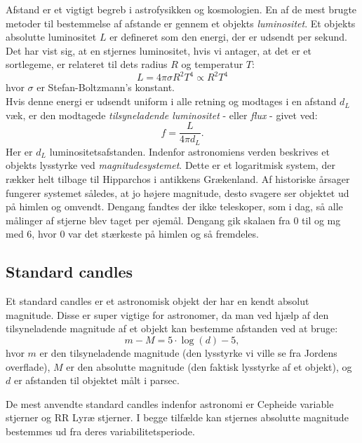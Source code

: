 \s
Afstand er et vigtigt begreb i astrofysikken og kosmologien. En af de mest brugte metoder til bestemmelse af afstande er gennem et objekts \textit{luminositet}. Et objekts absolutte luminositet $L$ er defineret som den energi, der er udsendt per sekund. Det har vist sig, at en stjernes luminositet, hvis vi antager, at det er et sortlegeme, er relateret til dets radius $R$ og temperatur $T$:
\begin{equation}
L = 4\pi\sigma R^2T^4 \propto R^2 T^4
\end{equation}
hvor $\sigma$ er Stefan-Boltzmann's konstant. \\
Hvis denne energi er udsendt uniform i alle retning og modtages i en afstand $d_L$ væk, er den modtagede \textit{tilsyneladende luminositet} - eller \textit{flux} - givet ved:
\begin{equation}
f = \frac{L}{4\pi d_L}.
\end{equation}
Her er $d_L$ luminositetsafstanden. Indenfor astronomiens verden beskrives et objekts lysstyrke ved \textit{magnitudesystemet}. Dette er et logaritmisk system, der rækker helt tilbage til Hipparchos i antikkens Grækenland. Af historiske årsager fungerer systemet således, at jo højere magnitude, desto svagere ser objektet ud på himlen og omvendt. Dengang fandtes der ikke teleskoper, som i dag, så alle målinger af stjerne blev taget per øjemål. Dengang gik skalaen fra 0 til og mg med 6, hvor 0 var det stærkeste på himlen og så fremdeles.

\subsection{Standard candles}

Et standard candles er et astronomisk objekt der har en kendt absolut magnitude. Disse er super vigtige for astronomer, da man ved hjælp af den tilsyneladende magnitude af et objekt kan bestemme afstanden ved at bruge:
\begin{equation}
m-M=5\cdot \log(d) - 5 ,
\end{equation}
hvor $m$ er den tilsyneladende magnitude (den lysstyrke vi ville se fra Jordens overflade), $M$ er den absolutte magnitude (den faktisk lysstyrke af et objekt), og $d$ er afstanden til objektet målt i parsec.

De mest anvendte standard candles indenfor astronomi er Cepheide variable stjerner og RR Lyræ stjerner. I begge tilfælde kan stjernes absolutte magnitude bestemmes ud fra deres variabilitetsperiode.

